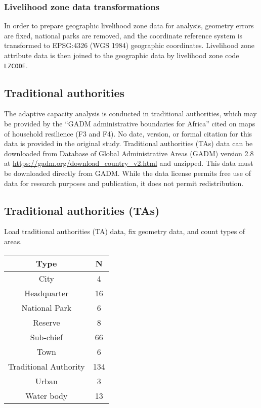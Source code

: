 \documentclass[
]{article}
\begin{document}
\hypertarget{livelihood-zone-data-transformations}{%
\subsubsection{Livelihood zone data
transformations}\label{livelihood-zone-data-transformations}}

In order to prepare geographic livelihood zone data for analysis,
geometry errors are fixed, national parks are removed, and the
coordinate reference system is transformed to EPSG:4326 (WGS 1984)
geographic coordinates. Livelihood zone attribute data is then joined to
the geographic data by livelihood zone code \texttt{LZCODE}.

\hypertarget{traditional-authorities}{%
\subsection{Traditional authorities}\label{traditional-authorities}}

The adaptive capacity analysis is conducted in traditional authorities,
which may be provided by the ``GADM administrative boundaries for
Africa'' cited on maps of household resilience (F3 and F4). No date,
version, or formal citation for this data is provided in the original
study. Traditional authorities (TAs) data can be downloaded from
Database of Global Administrative Areas (GADM) version 2.8 at
\url{https://gadm.org/download_country_v2.html} and unzipped. This data
must be downloaded directly from GADM. While the data license permits
free use of data for research purposes and publication, it does not
permit redistribution.

\hypertarget{traditional-authorities-tas}{%
\subsection{Traditional authorities
(TAs)}\label{traditional-authorities-tas}}

Load traditional authorities (TA) data, fix geometry data, and count
types of areas.

\begin{longtable}[]{@{}cc@{}}
\toprule\noalign{}
Type & N \\
\midrule\noalign{}
\endhead
\bottomrule\noalign{}
\endlastfoot
City & 4 \\
Headquarter & 16 \\
National Park & 6 \\
Reserve & 8 \\
Sub-chief & 66 \\
Town & 6 \\
Traditional Authority & 134 \\
Urban & 3 \\
Water body & 13 \\
\end{longtable}
\end{document}

